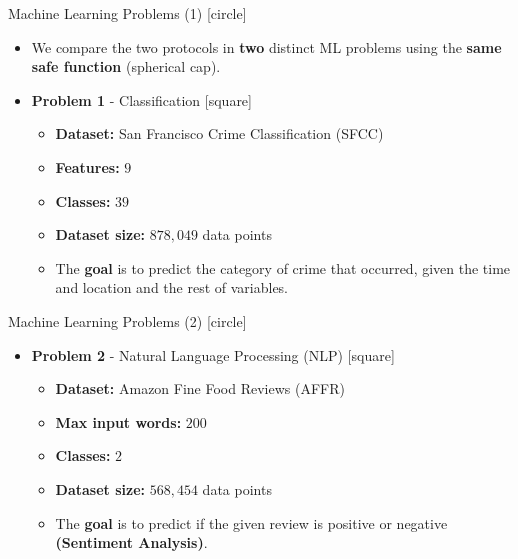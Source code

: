 \begin{frame}{Machine Learning Problems (1)}
    [circle]
    \begin{itemize}
        \item{We compare the two protocols in \textbf{two} distinct ML problems using the \textbf{same safe function} (spherical cap).}
        \vspace{0.3cm}
        \item{\textbf{Problem 1} - Classification
        \vspace{0.1cm}
        [square]
        \begin{itemize}
            \item{\textbf{Dataset:} San Francisco Crime Classification (SFCC)}
            \vspace{0.1cm}
            \item{\textbf{Features:} $9$}
            \vspace{0.1cm}
            \item{\textbf{Classes:} $39$}
            \vspace{0.1cm}
            \item{\textbf{Dataset size:} $878,049$ data points}
            \vspace{0.1cm}
            \item{The \textbf{goal} is to predict the category of crime that occurred, given the time and location and the rest of
            variables.}
        \end{itemize}
        }
    \end{itemize}
\end{frame}

\begin{frame}{Machine Learning Problems (2)}
    [circle]
    \begin{itemize}
        \item{\textbf{Problem 2} - Natural Language Processing (NLP)
        \vspace{0.1cm}
        [square]
        \begin{itemize}
            \item{\textbf{Dataset:} Amazon Fine Food Reviews (AFFR)}
            \vspace{0.2cm}
            \item{\textbf{Max input words:} $200$}
            \vspace{0.2cm}
            \item{\textbf{Classes:} $2$}
            \vspace{0.2cm}
            \item{\textbf{Dataset size:} $568,454$ data points}
            \vspace{0.2cm}
            \item{The \textbf{goal} is to predict if the given review is positive or negative\\\textbf{(Sentiment Analysis)}.}
        \end{itemize}
        }
    \end{itemize}
\end{frame}

